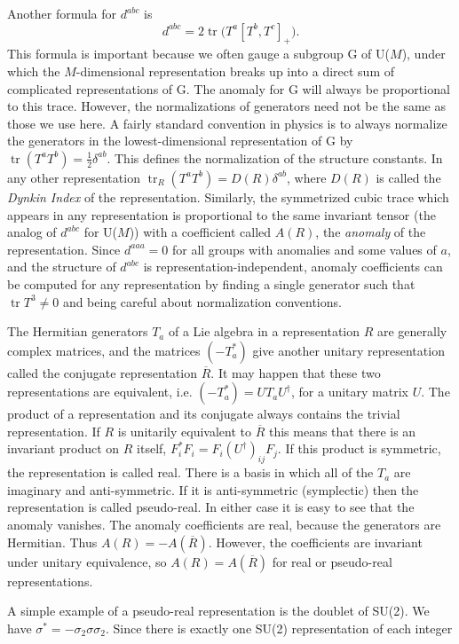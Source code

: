 Another formula for $d^{abc}$ is
\[
  d^{abc}=2\operatorname{tr}\bigl(T^a[T^b,T^c]_+\bigr).
\]
This formula is important because we often gauge a subgroup G of U($M$), under
which the $M$-dimensional representation breaks up into a direct sum of
complicated representations of G. The anomaly for G will always be
proportional to this trace. However, the normalizations of generators need not
be the same as those we use here. A fairly standard convention in physics is
to always normalize the generators in the lowest-dimensional representation of
G by $\operatorname{tr}(T^aT^b)=\tfrac12\delta^{ab}$. This defines the
normalization of the structure constants. In any other representation
$\operatorname{tr}_R(T^aT^b)=D(R)\delta^{ab}$, where $D(R)$ is called the
\emph{Dynkin Index} of the representation. Similarly, the symmetrized cubic
trace which appears in any representation is proportional to the same
invariant tensor (the analog of $d^{abc}$ for U($M$)) with a coefficient
called $A(R)$, the \emph{anomaly} of the representation. Since $d^{aaa}=0$
for all groups with anomalies and some values of $a$, and the structure of
$d^{abc}$ is representation-independent, anomaly coefficients can be
computed for any representation by finding a single generator such that
$\operatorname{tr}T^3\ne0$ and being careful about normalization conventions.

The Hermitian generators $T_a$ of a Lie algebra in a representation $R$ are
generally complex matrices, and the matrices $(-T_a^*)$ give another unitary
representation called the conjugate representation $\overline R$. It may
happen that these two representations are equivalent, i.e.
$(-T_a^*)=UT_aU^\dagger$, for a unitary matrix $U$. The product of a
representation and its conjugate always contains the trivial representation.
If $R$ is unitarily equivalent to $\overline R$ this means that there is an
invariant product on $R$ itself, $F_i^*F_i=F_i(U^\dagger)_{ij}F_j$. If this
product is symmetric, the representation is called real. There is a basis in
which all of the $T_a$ are imaginary and anti-symmetric. If it is
anti-symmetric (symplectic) then the representation is called pseudo-real. In
either case it is easy to see that the anomaly vanishes. The anomaly
coefficients are real, because the generators are Hermitian. Thus
$A(R)=-A(\overline R)$. However, the coefficients are invariant under
unitary equivalence, so $A(R)=A(\overline R)$ for real or pseudo-real
representations.

A simple example of a pseudo-real representation is the doublet of SU(2). We
have $\sigma^*=-\sigma_2\sigma\sigma_2$. Since there is exactly one SU(2)
representation of each integer

